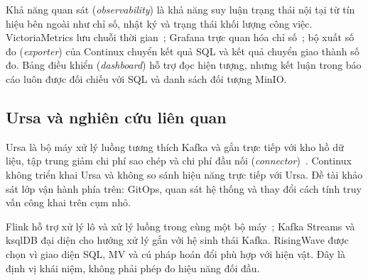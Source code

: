 Khả năng quan sát (\emph{observability}) là khả năng suy luận trạng thái nội tại từ tín hiệu bên ngoài như chỉ số, nhật ký và trạng thái khối lượng công việc. VictoriaMetrics lưu chuỗi thời gian~\parencite{victoriametricsdocs}; Grafana trực quan hóa chỉ số~\parencite{grafanadocs}; bộ xuất số đo (\emph{exporter}) của Continux chuyển kết quả SQL và kết quả chuyển giao thành số đo. Bảng điều khiển (\emph{dashboard}) hỗ trợ đọc hiện tượng, nhưng kết luận trong báo cáo luôn được đối chiếu với SQL và danh sách đối tượng MinIO.

\subsection{Ursa và nghiên cứu liên quan}
Ursa là bộ máy xử lý luồng tương thích Kafka và gắn trực tiếp với kho hồ dữ liệu, tập trung giảm chi phí sao chép và chi phí đầu nối (\emph{connector})~\parencite{merli2025ursa}. Continux không triển khai Ursa và không so sánh hiệu năng trực tiếp với Ursa. Đề tài khảo sát lớp vận hành phía trên: GitOps, quan sát hệ thống và thay đổi cách tính truy vấn công khai trên cụm nhỏ.

Flink hỗ trợ xử lý lô và xử lý luồng trong cùng một bộ máy~\parencite{carbone2015flink}; Kafka Streams và ksqlDB đại diện cho hướng xử lý gắn với hệ sinh thái Kafka. RisingWave được chọn vì giao diện SQL, MV và cú pháp hoán đổi phù hợp với hiện vật. Đây là định vị khái niệm, không phải phép đo hiệu năng đối đầu.
